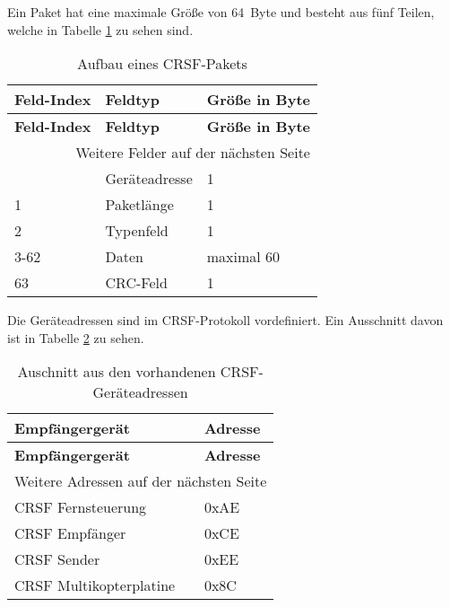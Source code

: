 Ein Paket hat eine maximale Größe von 64~Byte und besteht aus fünf Teilen, welche in Tabelle \ref{table:crsfPaket} zu sehen sind. \cite{cleanflightCrsf}

\begin{longtable}[c]{|l|l|l|}
    \caption{Aufbau eines CRSF-Pakets \cite{cleanflightCrsf}}
    \label{table:crsfPaket}\\
    \hline
    \textbf{Feld-Index} & \textbf{Feldtyp} & \textbf{Größe in Byte}\\
    \hline
    \hline
    \endfirsthead

    \hline
    \textbf{Feld-Index} & \textbf{Feldtyp} & \textbf{Größe in Byte}\\
    \hline
    \hline
    \endhead

    \hline
    \multicolumn{3}{|r|}{Weitere Felder auf der nächsten Seite}\\
    \hline
    \endfoot

    \hline
    \endlastfoot
    0 & Geräteadresse & 1\\
    \hline
    1 & Paketlänge & 1\\
    \hline
    2 & Typenfeld & 1\\
    \hline
    3-62 & Daten & maximal 60\\
    \hline
    63 & CRC-Feld & 1\\
\end{longtable}

Die Geräteadressen sind im CRSF-Protokoll vordefiniert. Ein Ausschnitt davon ist in Tabelle \ref{table:crsfAdressen} zu sehen.

\begin{longtable}[c]{|l|l|}
    \caption{Auschnitt aus den vorhandenen CRSF-Geräteadressen \cite{cleanflightCrsfP}}
    \label{table:crsfAdressen}\\
    \hline
    \textbf{Empfängergerät} & \textbf{Adresse}\\
    \hline
    \hline
    \endfirsthead

    \hline
    \textbf{Empfängergerät} & \textbf{Adresse}\\
    \hline
    \hline
    \endhead

    \hline
    \multicolumn{2}{|r|}{Weitere Adressen auf der nächsten Seite}\\
    \hline
    \endfoot

    \hline
    \endlastfoot
    
    CRSF Fernsteuerung & 0xAE \\
    \hline
    CRSF Empfänger & 0xCE \\
    \hline
    CRSF Sender & 0xEE \\
    \hline
    CRSF Multikopterplatine & 0x8C \\
\end{longtable}

